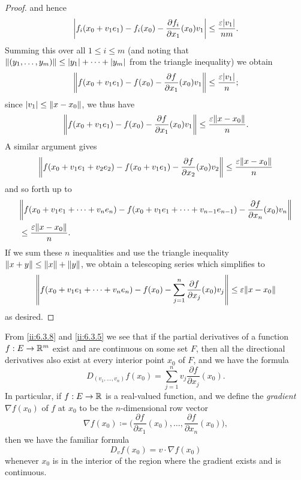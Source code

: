 \begin{proof}
  and hence
  \[
    \abs{f_i(x_0 + v_1 e_1) - f_i(x_0) - \dfrac{\partial f_i}{\partial x_1}(x_0) v_1} \leq \dfrac{\varepsilon \abs{v_1}}{nm}.
  \]
  Summing this over all \(1 \leq i \leq m\) (and noting that \(\norm*{(y_1, \dots, y_m)} \leq \abs{y_1} + \dots + \abs{y_m}\) from the triangle inequality) we obtain
  \[
    \norm*{f(x_0 + v_1 e_1) - f(x_0) - \dfrac{\partial f}{\partial x_1}(x_0) v_1} \leq \dfrac{\varepsilon \abs{v_1}}{n};
  \]
  since \(\abs{v_1} \leq \norm*{x - x_0}\), we thus have
  \[
    \norm*{f(x_0 + v_1 e_1) - f(x_0) - \dfrac{\partial f}{\partial x_1}(x_0) v_1} \leq \dfrac{\varepsilon \norm*{x - x_0}}{n}.
  \]
  A similar argument gives
  \[
    \norm*{f(x_0 + v_1 e_1 + v_2 e_2) - f(x_0 + v_1 e_1) - \dfrac{\partial f}{\partial x_2}(x_0) v_2} \leq \dfrac{\varepsilon \norm*{x - x_0}}{n}
  \]
  and so forth up to
  \begin{align*}
     & \norm*{f(x_0 + v_1 e_1 + \dots + v_n e_n) - f(x_0 + v_1 e_1 + \dots + v_{n - 1} e_{n - 1}) - \dfrac{\partial f}{\partial x_n}(x_0) v_n} \\
     & \leq \dfrac{\varepsilon \norm*{x - x_0}}{n}.
  \end{align*}
  If we sum these \(n\) inequalities and use the triangle inequality \(\norm*{x + y} \leq \norm*{x} + \norm*{y}\), we obtain a telescoping series which simplifies to
  \[
    \norm*{f(x_0 + v_1 e_1 + \dots + v_n e_n) - f(x_0) - \sum_{j = 1}^n \dfrac{\partial f}{\partial x_j}(x_0) v_j} \leq \varepsilon \norm*{x - x_0}
  \]
  as desired.
\end{proof}

\begin{ac}\label{ii:ac:6.3.3}
  From \cref{ii:6.3.8} and \cref{ii:6.3.5} we see that if the partial derivatives of a function \(f : E \to \R^m\) exist and are continuous on some set \(F\), then all the directional derivatives also exist at every interior point \(x_0\) of \(F\), and we have the formula
  \[
    D_{(v_1, \dots, v_n)} f(x_0) = \sum_{j = 1}^n v_j \dfrac{\partial f}{\partial x_j}(x_0).
  \]
  In particular, if \(f : E \to \R\) is a real-valued function, and we define the \emph{gradient} \(\nabla f(x_0)\) of \(f\) at \(x_0\) to be the \(n\)-dimensional row vector
  \[
    \nabla f(x_0) \coloneqq \bigg(\dfrac{\partial f}{\partial x_1}(x_0), \dots, \dfrac{\partial f}{\partial x_n}(x_0)\bigg),
  \]
  then we have the familiar formula
  \[
    D_v f(x_0) = v \cdot \nabla f(x_0)
  \]
  whenever \(x_0\) is in the interior of the region where the gradient exists and is continuous.
\end{ac}

